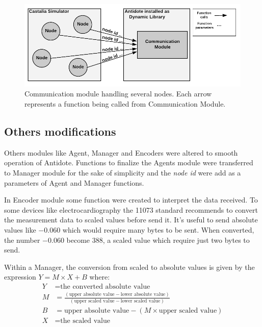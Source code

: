 \begin{figure}[htbp]
\centerline{\includegraphics[scale=0.31]{figures/communicationModule.png}}
\caption{Communication module handling several nodes. Each arrow represents a function being called from Communication Module.}
\label{fig:communicationModuleCastalia}
\end{figure}

\subsection{Others modifications}

Others modules like Agent, Manager and Encoders were altered to smooth operation of Antidote. Functions to finalize the Agents module were transferred to Manager module for the sake of simplicity and the \textit{node id} were add as a parameters of Agent and Manager functions.

In Encoder module some function were created to interpret the data received. To some devices like electrocardiography the 11073 standard \cite{b1} recommends to convert the measurement data to scaled values before send it. It's useful to send absolute values like $-0.060$  which would require many bytes to be sent. When converted, the number $-0.060$ become $388$, a scaled value which require just two bytes to send.

Within a Manager, the conversion from scaled to absolute values is given by the expression $Y = M \times X + B$ where:
\begin{align*}
    Y &= \text{the converted absolute value}\\
    M &= \frac{(\text{upper absolute value} - \text{lower absolute value})}{(\text{upper scaled value} - \text{lower scaled value})}\\
    B &= \text{upper absolute value} - (M \times \text{upper scaled value})\\
    X &= \text{the scaled value}
\end{align*}

